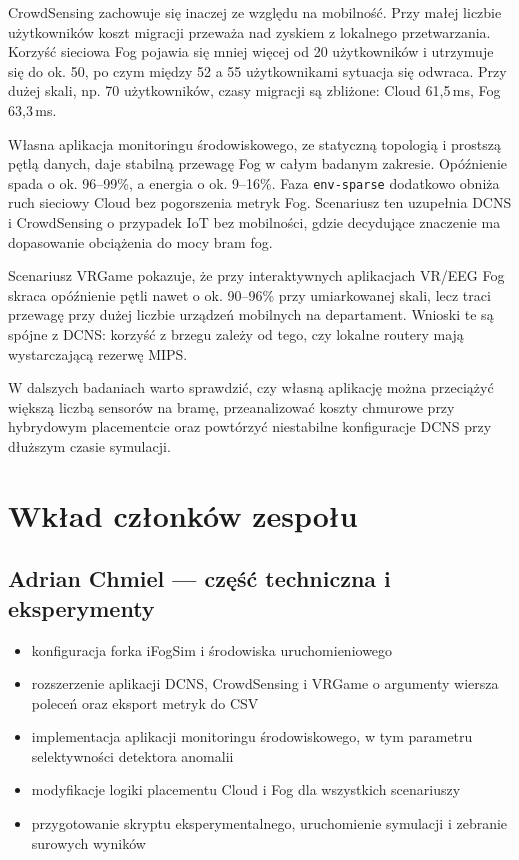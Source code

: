 \documentclass[
    oneside,            %
    left=2.5cm,         %
    right=2.5cm,        %
    top=2.5cm,          %
    bottom=3cm,         %
    bindingoffset=6mm,  %
    nohyphenation=false %
]{eiti/eiti-report}
\begin{document}
CrowdSensing zachowuje się inaczej ze względu na mobilność. Przy małej liczbie użytkowników koszt migracji przeważa nad zyskiem z lokalnego przetwarzania. Korzyść sieciowa Fog pojawia się mniej więcej od 20 użytkowników i utrzymuje się do ok. 50, po czym między 52 a 55 użytkownikami sytuacja się odwraca. Przy dużej skali, np. 70 użytkowników, czasy migracji są zbliżone: Cloud 61{,}5\,ms, Fog 63{,}3\,ms.

Własna aplikacja monitoringu środowiskowego, ze statyczną topologią i prostszą pętlą danych, daje stabilną przewagę Fog w całym badanym zakresie. Opóźnienie spada o ok. 96--99\%, a energia o ok. 9--16\%. Faza \texttt{env-sparse} dodatkowo obniża ruch sieciowy Cloud bez pogorszenia metryk Fog. Scenariusz ten uzupełnia DCNS i CrowdSensing o przypadek IoT bez mobilności, gdzie decydujące znaczenie ma dopasowanie obciążenia do mocy bram fog.

Scenariusz VRGame pokazuje, że przy interaktywnych aplikacjach VR/EEG Fog skraca opóźnienie pętli nawet o ok. 90--96\% przy umiarkowanej skali, lecz traci przewagę przy dużej liczbie urządzeń mobilnych na departament. Wnioski te są spójne z DCNS: korzyść z brzegu zależy od tego, czy lokalne routery mają wystarczającą rezerwę MIPS.

W dalszych badaniach warto sprawdzić, czy własną aplikację można przeciążyć większą liczbą sensorów na bramę, przeanalizować koszty chmurowe przy hybrydowym placementcie oraz powtórzyć niestabilne konfiguracje DCNS przy dłuższym czasie symulacji.

\section{Wkład członków zespołu}

\subsection*{Adrian Chmiel --- część techniczna i eksperymenty}
\begin{itemize}[noitemsep,topsep=2pt]
    \item konfiguracja forka iFogSim i środowiska uruchomieniowego
    \item rozszerzenie aplikacji DCNS, CrowdSensing i VRGame o argumenty wiersza poleceń oraz eksport metryk do CSV
    \item implementacja aplikacji monitoringu środowiskowego, w tym parametru selektywności detektora anomalii
    \item modyfikacje logiki placementu Cloud i Fog dla wszystkich scenariuszy
    \item przygotowanie skryptu eksperymentalnego, uruchomienie symulacji i zebranie surowych wyników
\end{itemize}
\end{document}
